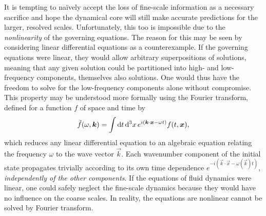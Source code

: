 \documentclass[../main.tex]{subfiles}
\begin{document}
It is tempting to na\"{i}vely accept the loss of fine-scale information as a
necessary sacrifice and hope the dynamical core will still make accurate
predictions for the larger, resolved scales. Unfortunately, this too is
impossible due to the \emph{nonlinearity} of the governing equations. The
reason for this may be seen by considering linear differential equations as a
counterexample. If the governing equations were linear, they would allow
arbitrary superpositions of solutions, meaning that any given solution could be
partitioned into high- and low-frequency components, themselves also solutions.
One would thus have the freedom to solve for the low-frequency components alone
without compromise. This property may be understood more formally using the
Fourier transform, defined for a function $f$ of space and time by
\[
    \tilde{f}(\omega, \bm{k})
        = \int \mathrm{d}t\,\mathrm{d}^3{x}\, e^{i(\bm{k} \cdot \bm{x} - \omega t)}
        f(t, \bm{x}),
\]
which reduces any linear differential equation to an algebraic equation
relating the frequency $\omega$ to the wave vector $\vec{k}$. Each wavenumber
component of the initial state propagates trivially according to its own
time dependence $e^{-i(\vec{k} \cdot \vec{x} - \omega(\vec{k}) t)}$,
\emph{independently of the other components}. If the equations of fluid
dynamics were linear, one could safely neglect the fine-scale dynamics because
they would have no influence on the coarse scales. In reality, the equations
are nonlinear cannot be solved by Fourier transform.
\end{document}
